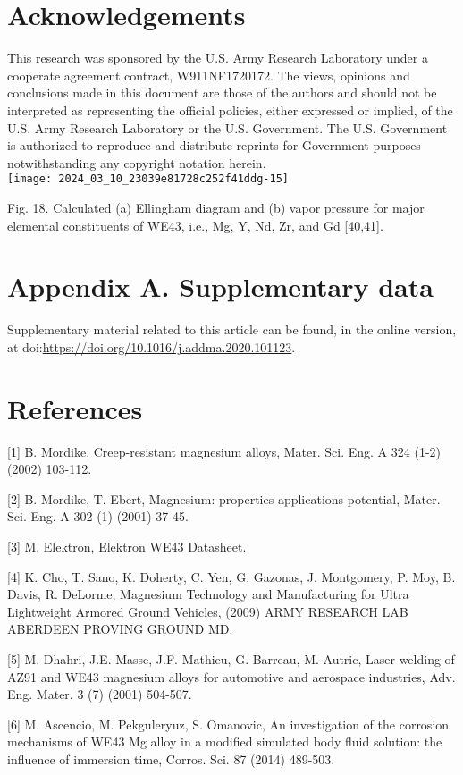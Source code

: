 \documentclass[10pt]{article}
\begin{document}
\section*{Acknowledgements}
This research was sponsored by the U.S. Army Research Laboratory under a cooperate agreement contract, W911NF1720172. The views, opinions and conclusions made in this document are those of the authors and should not be interpreted as representing the official policies, either expressed or implied, of the U.S. Army Research Laboratory or the U.S. Government. The U.S. Government is authorized to reproduce and distribute reprints for Government purposes notwithstanding any copyright notation herein.\\
\texttt{[image: 2024\_03\_10\_23039e81728c252f41ddg-15]}

Fig. 18. Calculated (a) Ellingham diagram and (b) vapor pressure for major elemental constituents of WE43, i.e., Mg, Y, Nd, Zr, and Gd [40,41].

\section*{Appendix A. Supplementary data}
Supplementary material related to this article can be found, in the online version, at doi:\href{https://doi.org/10.1016/j.addma.2020.101123}{https://doi.org/10.1016/j.addma.2020.101123}.

\section*{References}
[1] B. Mordike, Creep-resistant magnesium alloys, Mater. Sci. Eng. A 324 (1-2) (2002) 103-112.

[2] B. Mordike, T. Ebert, Magnesium: properties-applications-potential, Mater. Sci. Eng. A 302 (1) (2001) 37-45.

[3] M. Elektron, Elektron WE43 Datasheet.

[4] K. Cho, T. Sano, K. Doherty, C. Yen, G. Gazonas, J. Montgomery, P. Moy, B. Davis, R. DeLorme, Magnesium Technology and Manufacturing for Ultra Lightweight Armored Ground Vehicles, (2009) ARMY RESEARCH LAB ABERDEEN PROVING GROUND MD.

[5] M. Dhahri, J.E. Masse, J.F. Mathieu, G. Barreau, M. Autric, Laser welding of AZ91 and WE43 magnesium alloys for automotive and aerospace industries, Adv. Eng. Mater. 3 (7) (2001) 504-507.

[6] M. Ascencio, M. Pekguleryuz, S. Omanovic, An investigation of the corrosion mechanisms of WE43 Mg alloy in a modified simulated body fluid solution: the influence of immersion time, Corros. Sci. 87 (2014) 489-503.
\end{document}
